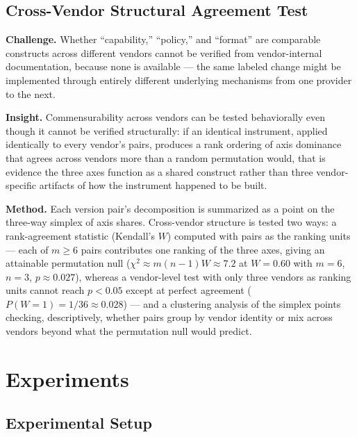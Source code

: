 \documentclass[11pt]{article}
\begin{document}
\subsection{Cross-Vendor Structural Agreement Test}
\textbf{Challenge.} Whether ``capability,'' ``policy,'' and ``format'' are comparable constructs across different vendors cannot be verified from vendor-internal documentation, because none is available --- the same labeled change might be implemented through entirely different underlying mechanisms from one provider to the next.

\textbf{Insight.} Commensurability across vendors can be tested behaviorally even though it cannot be verified structurally: if an identical instrument, applied identically to every vendor's pairs, produces a rank ordering of axis dominance that agrees across vendors more than a random permutation would, that is evidence the three axes function as a shared construct rather than three vendor-specific artifacts of how the instrument happened to be built.

\textbf{Method.} Each version pair's decomposition is summarized as a point on the three-way simplex of axis shares. Cross-vendor structure is tested two ways: a rank-agreement statistic (Kendall's $W$) computed with pairs as the ranking units --- each of $m \geq 6$ pairs contributes one ranking of the three axes, giving an attainable permutation null ($\chi^2 \approx m(n{-}1)W \approx 7.2$ at $W = 0.60$ with $m = 6$, $n = 3$, $p \approx 0.027$), whereas a vendor-level test with only three vendors as ranking units cannot reach $p < 0.05$ except at perfect agreement ($P(W{=}1) = 1/36 \approx 0.028$) --- and a clustering analysis of the simplex points checking, descriptively, whether pairs group by vendor identity or mix across vendors beyond what the permutation null would predict.

\section{Experiments}

\subsection{Experimental Setup}
\end{document}
